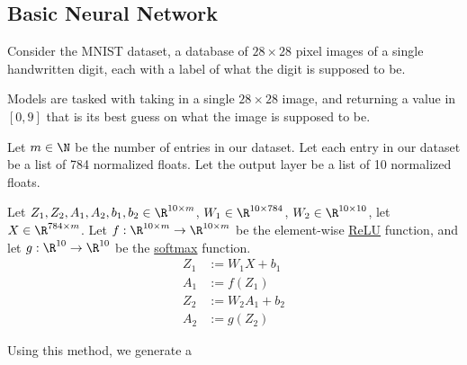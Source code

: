 \subsection{Basic Neural Network}\label{fbc9851}

\label{af28d9f}

Consider the MNIST dataset, a database of $28\times28$ pixel images of a single
handwritten digit, each with a label of what the digit is supposed to be.

Models are tasked with taking in a single $28\times28$ image, and returning a
value in $[0,9]$ that is its best guess on what the image is supposed to be.

\label{baa40d7}

Let $m\in\N$ be the number of entries in our dataset. Let each entry in our
dataset be a list of 784 normalized floats. Let the output layer be a list of
10 normalized floats.

Let $Z_1,Z_2,A_1,A_2,b_1,b_2\in\R^{10\times m}$, $W_1\in\R^{10\times784}$,
$W_2\in\R^{10\times10}$, let $X\in\R^{784\times m}$. Let $f:\R^{10\times
m}\to\R^{10\times m}$ be the element-wise \href{fe694c2}{ReLU} function, and
let $g:\R^{10}\to\R^{10}$ be the \href{fdaba2f}{softmax} function.
\begin{align*}
  Z_1 &:=W_1X+b_1   \\
  A_1 &:=f(Z_1)     \\
  Z_2 &:=W_2A_1+b_2 \\
  A_2 &:=g(Z_2)
\end{align*}

Using this method, we generate a

